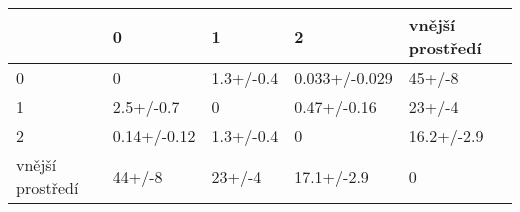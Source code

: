 \begin{tabular}{lllll}
\toprule
{} &            0 &          1 &              2 & vnější prostředí \\
\midrule
0                &            0 &  1.3+/-0.4 &  0.033+/-0.029 &           45+/-8 \\
1                &    2.5+/-0.7 &          0 &    0.47+/-0.16 &           23+/-4 \\
2                &  0.14+/-0.12 &  1.3+/-0.4 &              0 &       16.2+/-2.9 \\
vnější prostředí &       44+/-8 &     23+/-4 &     17.1+/-2.9 &                0 \\
\bottomrule
\end{tabular}
